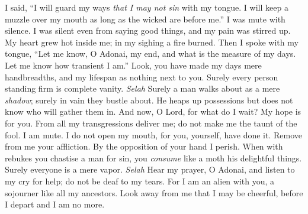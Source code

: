 \begin{biblechapter} %
 I said, “I will guard my ways 
\textit{that I may not sin} with my tongue. 
I will keep a muzzle over my mouth 
as long as the wicked are before me.”
\verse I was mute with silence. I was silent even from saying good things, 
and my pain was stirred up.
\verse My heart grew hot inside me; 
in my sighing a fire burned. 
Then I spoke with my tongue,
\verse “Let me know, O Adonai, my end, 
and what is the measure of my days. 
Let me know how transient I am.”
\verse Look, you have made my days mere handbreadths, 
and my lifespan as nothing next to you. 
Surely every person standing firm is complete vanity. \textit{Selah}
\verse Surely a man walks about as a mere \textit{shadow}; 
surely in vain they bustle about. 
He heaps up possessions but does not know who will gather them in.
\verse And now, O Lord, for what do I wait? 
My hope is for you.
\verse From all my transgressions deliver me; 
do not make me the taunt of the fool.
\verse I am mute. I do not open my mouth, 
for you, yourself, have done it.
\verse Remove from me your affliction. 
By the opposition of your hand I perish.
\verse When with rebukes you chastise a man for sin, 
you \textit{consume} like a moth his delightful things. 
Surely everyone is a mere vapor. \textit{Selah}
\verse Hear my prayer, O Adonai, and listen to my cry for help; 
do not be deaf to my tears. 
For I am an alien with you, 
a sojourner like all my ancestors.
\verse Look away from me that I may be cheerful, 
before I depart and I am no more.
\end{biblechapter}

